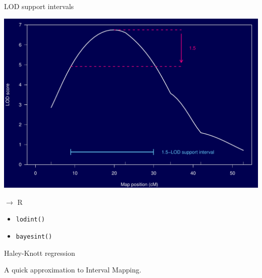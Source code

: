 \documentclass[12pt]{article}
\newcommand{\headsize}{\fontsize{35}{35} \selectfont}
\newcommand{\smallsize}{\fontsize{25}{30} \selectfont}
\begin{document}
\newpage

\headsize \color{myyellow}
\hfill \begin{minipage}{5.75in}
\centering
LOD support intervals
\end{minipage}

\vfill

\centerline{\includegraphics{Figs/lodsuppint.pdf}}




\newpage

\headsize \color{myyellow}
$\boldsymbol{\rightarrow}$ R

\vspace{3cm}

\color{mywhite} \smallsize

\hfill \begin{minipage}[t]{9.5in}
\begin{itemize}
\itemsep24pt
\item \verb|lodint()|
\item \verb|bayesint()|
\end{itemize} \end{minipage}



\newpage

\headsize \color{myyellow}
\hfill \begin{minipage}{5.75in}
\centering
Haley-Knott regression
\end{minipage}

\vspace{3cm}

\color{mywhite} \smallsize

\hspace*{0.5in}
A quick approximation to Interval Mapping.
\end{document}
